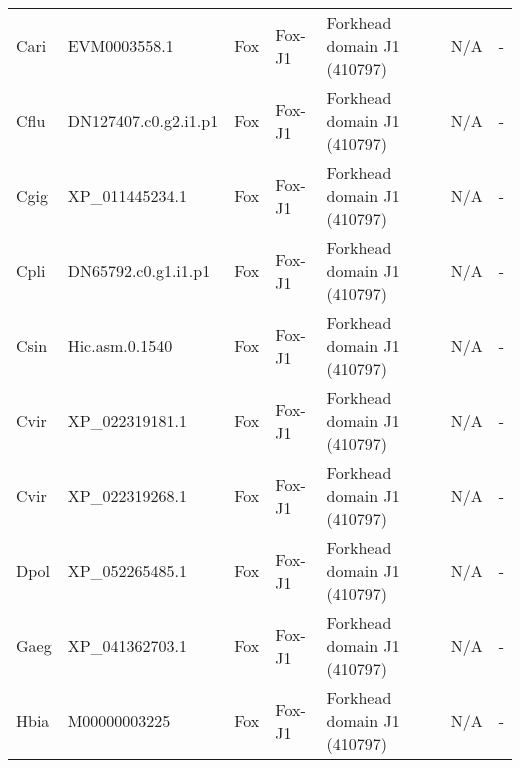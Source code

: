 \documentclass[../main.tex]{subfiles}
\begin{document}
\begin{landscape}
\begin{longtable}{lllllll}
		Cari           & EVM0003558.1          & Fox            & Fox-J1              & Forkhead domain J1 (410797)                 & N/A                                                                    & -                    \\
		Cflu           & DN127407.c0.g2.i1.p1  & Fox            & Fox-J1              & Forkhead domain J1 (410797)                 & N/A                                                                    & -                    \\
		Cgig           & XP\_011445234.1       & Fox            & Fox-J1              & Forkhead domain J1 (410797)                 & N/A                                                                    & -                    \\
		Cpli           & DN65792.c0.g1.i1.p1   & Fox            & Fox-J1              & Forkhead domain J1 (410797)                 & N/A                                                                    & -                    \\
		Csin           & Hic.asm.0.1540        & Fox            & Fox-J1              & Forkhead domain J1 (410797)                 & N/A                                                                    & -                    \\
		Cvir           & XP\_022319181.1       & Fox            & Fox-J1              & Forkhead domain J1 (410797)                 & N/A                                                                    & -                    \\
		Cvir           & XP\_022319268.1       & Fox            & Fox-J1              & Forkhead domain J1 (410797)                 & N/A                                                                    & -                    \\
		Dpol           & XP\_052265485.1       & Fox            & Fox-J1              & Forkhead domain J1 (410797)                 & N/A                                                                    & -                    \\
		Gaeg           & XP\_041362703.1       & Fox            & Fox-J1              & Forkhead domain J1 (410797)                 & N/A                                                                    & -                    \\
		Hbia           & M00000003225          & Fox            & Fox-J1              & Forkhead domain J1 (410797)                 & N/A                                                                    & -                    \\

\end{longtable}
\end{landscape}
\end{document}
